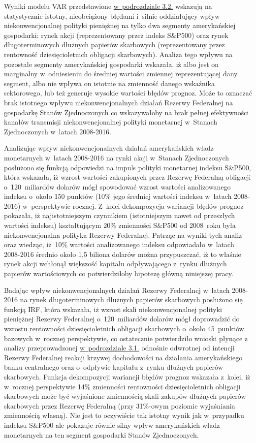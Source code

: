 Wyniki modelu \acs{VAR} przedstawione \hyperlink{podrz32}{w~podrozdziale 3.2.} wskazują na statystycznie istotny, nieobciążony błędami i~silnie oddziałujący wpływ niekonwencjonalnej polityki pieniężnej na tylko dwa segmenty amerykańskiej gospodarki: rynek akcji (reprezentowany przez indeks S\&P500) oraz rynek długoterminowych dłużnych papierów skarbowych (reprezentowany przez rentowność dziesięcioletnich obligacji skarbowych). Analiza tego wpływu na pozostałe segmenty amerykańskiej gospodarki wskazała, iż albo jest on marginalny w~odniesieniu do średniej wartości zmiennej reprezentującej dany segment, albo nie wpływa on istotnie na zmienność danego wskaźnika sektorowego, lub też generuje wysokie wartości błędów prognoz. Może to oznaczać brak istotnego wpływu niekonwencjonalnych działań Rezerwy Federalnej na gospodarkę Stanów Zjednoczonych co wskazywałoby na brak pełnej efektywności kanałów transmisji niekonwencjonalnej polityki monetarnej w~Stanach Zjednoczonych w~latach 2008-2016. 

Analizując wpływ niekonwencjonalnych działań amerykańskich władz monetarnych w~latach 2008-2016 na rynki akcji w~Stanach Zjednoczonych posłużono się funkcją odpowiedzi na impuls polityki monetarnej indeksu S\&P500, która wskazała, iż wzrost wartości zakupionych przez Rezerwę Federalną obligacji o~120~miliardów dolarów mógł spowodować wzrost wartości analizowanego indeksu o~około 150 punktów (10\% jego średniej wartości indeksu w~latach 2008-2016) w~perspektywie rocznej. Z~kolei dekompozycja wariancji błędów prognoz pokazała, iż najistotniejszym czynnikiem (istotniejszym nawet od przeszłych wartości indeksu) kształtującym 20\% zmienności S\&P500 od 2008~roku była niekonwencjonalna polityka Rezerwy Federalnej. Patrząc na wyniki tych analiz oraz wiedząc, iż~10\% wartości analizowanego indeksu odpowiadało w~latach 2008-2016 średnio około 1,5 biliona dolarów można przypuszczać, iż to właśnie rynek akcji wchłonął większość kapitału odpływającego z~rynku dłużnych papierów wartościowych co potwierdziłoby hipotezę główną niniejszej pracy.

Badając wpływ niekonwencjonalnych działań Rezerwy Federalnej w~latach 2008-2016 na rynek długoterminowych dłużnych papierów skarbowych posłużono się funkcją \acs{IRF}, która wskazała, iż wzrost skali niekonwencjonalnej polityki pieniężnej Rezerwy Federalnej o~120~miliardów dolarów mógł doprowadzić do wzrostu rentowności dziesięcioletnich obligacji skarbowych o~około 45~punktów bazowych w~rocznej perspektywie, co ostatecznie potwierdziło wnioski płynące z analizy przeprowadzonej \hyperlink{podrz31}{w~podrozdziale 3.1.} odnośnie odwrotnej od intencji Rezerwy Federalnej reakcji krzywej dochodowości na działania amerykańskiego banku centralnego oraz o~odpływie kapitału z~rynku dłużnych papierów skarbowych. Funkcja dekompozycji wariancji błędów prognoz wskazała z~kolei, iż w~rocznej perspektywie 14\% zmienności rentowności dziesięcioletnich obligacji skarbowych może być wyjaśnione zmiennością skali zakupów dłużnych papierów skarbowych przez Rezerwę Federalną (przy 31\%-owym poziomie wyjaśniania zmiennością własną). Nie jest to oczywiście tak istotny wynik jak w~przypadku indeksu S\&P500 ale pokazuje równie silny wpływ amerykańskich władz monetarnych na ten segment gospodarki Stanów Zjednoczonych.

